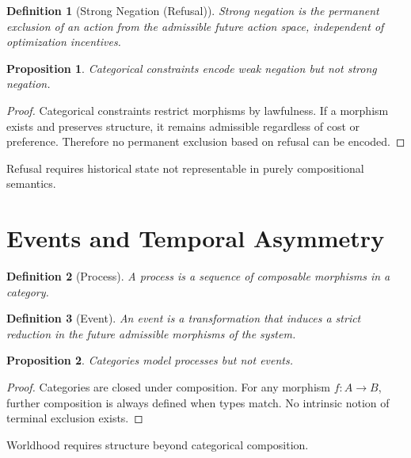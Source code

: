 \documentclass[11pt]{article}
\newtheorem{definition}{Definition}
\newtheorem{proposition}{Proposition}
\begin{document}
\begin{definition}[Strong Negation (Refusal)]
Strong negation is the permanent exclusion of an action from the admissible
future action space, independent of optimization incentives.
\end{definition}

\begin{proposition}
Categorical constraints encode weak negation but not strong negation.
\end{proposition}

\begin{proof}
Categorical constraints restrict morphisms by lawfulness. If a morphism exists
and preserves structure, it remains admissible regardless of cost or preference.
Therefore no permanent exclusion based on refusal can be encoded.
\end{proof}

\begin{corollary}
Refusal requires historical state not representable in purely compositional
semantics.
\end{corollary}

\section{Events and Temporal Asymmetry}

\begin{definition}[Process]
A process is a sequence of composable morphisms in a category.
\end{definition}

\begin{definition}[Event]
An event is a transformation that induces a strict reduction in the future
admissible morphisms of the system.
\end{definition}

\begin{proposition}
Categories model processes but not events.
\end{proposition}

\begin{proof}
Categories are closed under composition. For any morphism $f : A \to B$, further
composition is always defined when types match. No intrinsic notion of terminal
exclusion exists.
\end{proof}

\begin{corollary}
Worldhood requires structure beyond categorical composition.
\end{corollary}
\end{document}
